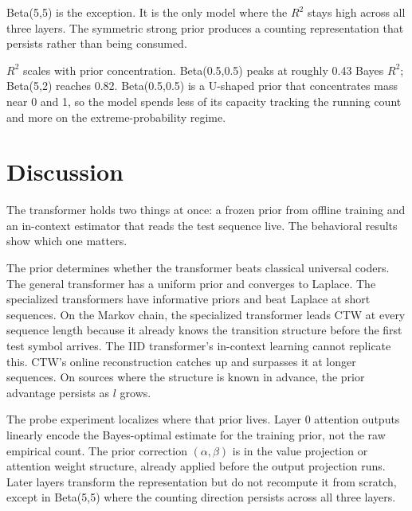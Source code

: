 \documentclass[onecolumn,english,12pt]{IEEEtran}
\begin{document}
Beta(5,5) is the exception.
It is the only model where the $R^2$ stays high across all three layers.
The symmetric strong prior produces a counting representation that persists rather than being consumed.

$R^2$ scales with prior concentration.
Beta(0.5,0.5) peaks at roughly 0.43 Bayes $R^2$; Beta(5,2) reaches 0.82.
Beta(0.5,0.5) is a U-shaped prior that concentrates mass near 0 and 1, so the model spends less of its capacity tracking the running count and more on the extreme-probability regime.

\FloatBarrier

\section{Discussion}
\label{sec:discussion}

The transformer holds two things at once: a frozen prior from offline training and an in-context estimator that reads the test sequence live.
The behavioral results show which one matters.

The prior determines whether the transformer beats classical universal coders.
The general transformer has a uniform prior and converges to Laplace.
The specialized transformers have informative priors and beat Laplace at short sequences.
On the Markov chain, the specialized transformer leads CTW at every sequence length because it already knows the transition structure before the first test symbol arrives.
The IID transformer's in-context learning cannot replicate this.
CTW's online reconstruction catches up and surpasses it at longer sequences.
On sources where the structure is known in advance, the prior advantage persists as $l$ grows.

The probe experiment localizes where that prior lives.
Layer 0 attention outputs linearly encode the Bayes-optimal estimate for the training prior, not the raw empirical count.
The prior correction $(\alpha, \beta)$ is in the value projection or attention weight structure, already applied before the output projection runs.
Later layers transform the representation but do not recompute it from scratch, except in Beta(5,5) where the counting direction persists across all three layers.


\end{document}
